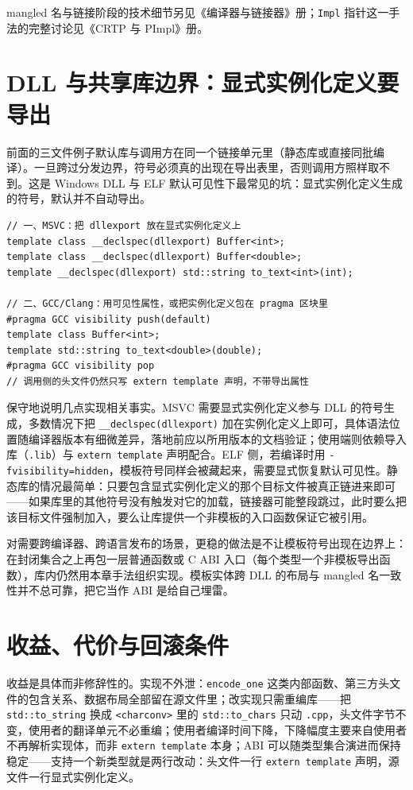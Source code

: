 \documentclass[12pt,a4paper,fontset=fandol]{ctexbook}
\newcommand{\kw}[1]{\texttt{#1}}
\begin{document}
mangled 名与链接阶段的技术细节另见《编译器与链接器》册；\kw{Impl} 指针这一手法的完整讨论见《CRTP 与 PImpl》册。

\section{DLL 与共享库边界：显式实例化定义要导出}

前面的三文件例子默认库与调用方在同一个链接单元里（静态库或直接同批编译）。一旦跨过分发边界，符号必须真的出现在导出表里，否则调用方照样取不到。这是 Windows DLL 与 ELF 默认可见性下最常见的坑：显式实例化定义生成的符号，默认并不自动导出。

\begin{lstlisting}[style=cppstyle,caption={导出显式实例化定义：MSVC 形态与 GCC/Clang 形态}]
// 一、MSVC：把 dllexport 放在显式实例化定义上
template class __declspec(dllexport) Buffer<int>;
template class __declspec(dllexport) Buffer<double>;
template __declspec(dllexport) std::string to_text<int>(int);

// 二、GCC/Clang：用可见性属性，或把实例化定义包在 pragma 区块里
#pragma GCC visibility push(default)
template class Buffer<int>;
template std::string to_text<double>(double);
#pragma GCC visibility pop
// 调用侧的头文件仍然只写 extern template 声明，不带导出属性
\end{lstlisting}

保守地说明几点实现相关事实。MSVC 需要显式实例化定义参与 DLL 的符号生成，多数情况下把 \kw{\_\_declspec(dllexport)} 加在实例化定义上即可，具体语法位置随编译器版本有细微差异，落地前应以所用版本的文档验证；使用端则依赖导入库（\kw{.lib}）与 \kw{extern template} 声明配合。ELF 侧，若编译时用 \kw{-fvisibility=hidden}，模板符号同样会被藏起来，需要显式恢复默认可见性。静态库的情况最简单：只要包含显式实例化定义的那个目标文件被真正链进来即可——如果库里的其他符号没有触发对它的加载，链接器可能整段跳过，此时要么把该目标文件强制加入，要么让库提供一个非模板的入口函数保证它被引用。

对需要跨编译器、跨语言发布的场景，更稳的做法是不让模板符号出现在边界上：在封闭集合之上再包一层普通函数或 C ABI 入口（每个类型一个非模板导出函数），库内仍然用本章手法组织实现。模板实体跨 DLL 的布局与 mangled 名一致性并不总可靠，把它当作 ABI 是给自己埋雷。

\section{收益、代价与回滚条件}

收益是具体而非修辞性的。实现不外泄：\kw{encode\_one} 这类内部函数、第三方头文件的包含关系、数据布局全部留在源文件里；改实现只需重编库——把 \kw{std::to\_string} 换成 \kw{<charconv>} 里的 \kw{std::to\_chars} 只动 \kw{.cpp}，头文件字节不变，使用者的翻译单元不必重编；使用者编译时间下降，下降幅度主要来自使用者不再解析实现体，而非 \kw{extern template} 本身；ABI 可以随类型集合演进而保持稳定——支持一个新类型就是两行改动：头文件一行 \kw{extern template} 声明，源文件一行显式实例化定义。
\end{document}
